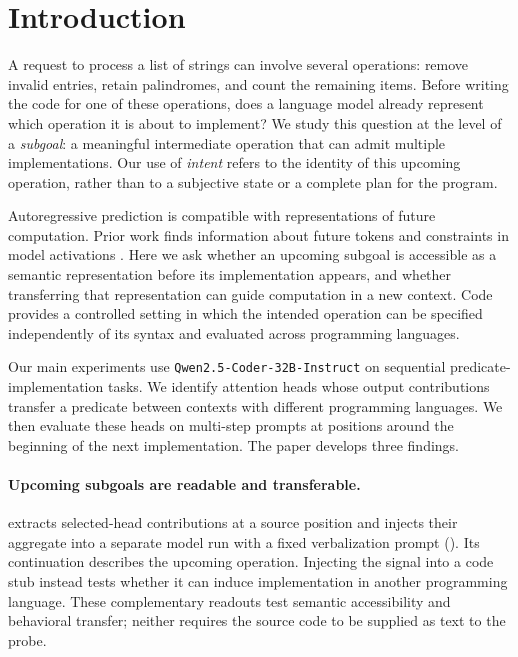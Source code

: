 \section{Introduction}
\label{sec:intro}

A request to process a list of strings can involve several operations: remove invalid entries, retain palindromes, and count the remaining items. Before writing the code for one of these operations, does a language model already represent which operation it is about to implement? We study this question at the level of a \emph{subgoal}: a meaningful intermediate operation that can admit multiple implementations. Our use of \emph{intent} refers to the identity of this upcoming operation, rather than to a subjective state or a complete plan for the program.

Autoregressive prediction is compatible with representations of future computation. Prior work finds information about future tokens and constraints in model activations \citep{pal2023futurelens,lindsey2025biology}. Here we ask whether an upcoming subgoal is accessible as a semantic representation before its implementation appears, and whether transferring that representation can guide computation in a new context. Code provides a controlled setting in which the intended operation can be specified independently of its syntax and evaluated across programming languages.

Our main experiments use \texttt{Qwen2.5-Coder-32B-Instruct} on sequential predicate-implementation tasks. We identify attention heads whose output contributions transfer a predicate between contexts with different programming languages. We then evaluate these heads on multi-step prompts at positions around the beginning of the next implementation. The paper develops three findings.

\paragraph{Upcoming subgoals are readable and transferable.}
\goalscope extracts selected-head contributions at a source position and injects their aggregate into a separate model run with a fixed verbalization prompt (). Its continuation describes the upcoming operation. Injecting the signal into a code stub instead tests whether it can induce implementation in another programming language. These complementary readouts test semantic accessibility and behavioral transfer; neither requires the source code to be supplied as text to the probe.

